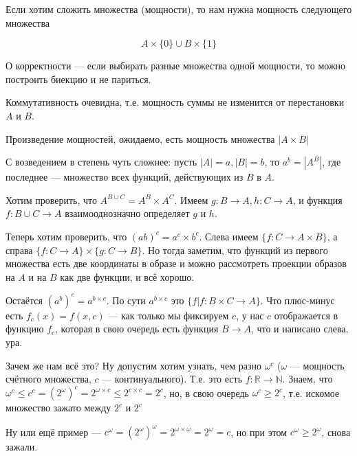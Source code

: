 
Если хотим сложить множества (мощности), то нам нужна мощность следующего множества

{
\large
$$
A \times \{0\} \cup B \times \{1\}
$$
}

О корректности --- если выбирать разные множества одной мощности, то можно построить биекцию и не париться.

Коммутативность очевидна, т.е. мощность суммы не изменится от перестановки $A$ и $B$.

Произведение мощностей, ожидаемо, есть мощность множества $|A \times B|$

С возведением в степень чуть сложнее: пусть $|A| = a, |B| = b$, то $a^b = |A^B|$, где последнее --- множество всех функций, действующих из $B$ в $A$.

Хотим проверить, что $A^{B \sqcup C} = A^B \times A^C$. Имеем $g : B \to A, h : C \to A$, и функция $f : B \cup C \to A$ взаимооднозначно определяет $g $ и $h$.

Теперь хотим проверить, что $(ab)^c = a^c \times b^c$. Слева имеем $\{f : C \to A \times B\}$, а справа $\{ f : C \to A  \} \times \{g : C \to B\}$. Но тогда заметим, что функций из первого множества есть две координаты в образе и можно рассмотреть проекции образов  на $A$ и на $B$ как две функции, и всё хорошо.

Остаётся $(a ^ b)^c = a^{b \times c}$. По сути $a^{b \times c}$ это $\{f | f : B \times C \to A\}$. Что плюс-минус есть $f_c(x) = f(x, c)$ --- как только мы фиксируем $c$, у нас $c$ отображается в функцию $f_c$, которая в свою очередь есть функция $B \to A$, что и написано слева, ура.

Зачем же нам всё это? Ну допустим хотим узнать, чем разно $\omega^c$ ($\omega $ --- мощность счётного множества, $c$ --- континуального). Т.е. это есть $f : \mathbb{R} \to \mathbb{N}$. Знаем, что $\omega^c \le c^c = (2^{\omega})^c = 2^{\omega \times c} \le 2^{c \times c} = 2^{c}$, но, в свою очередь $\omega ^ c \ge 2^c$, т.е. искомое множество зажато между $2^c$ и $2^c$

Ну или ещё пример --- $c^{\omega} = (2^{\omega})^{\omega} = 2^{\omega \times \omega} = 2^{\omega} = c$, но при этом $c^{\omega} \ge 2^{\omega}$, снова зажали.


